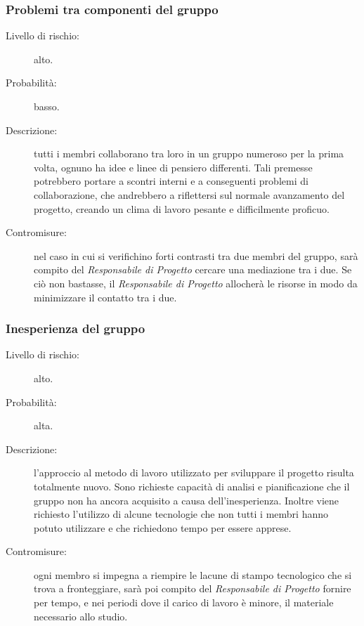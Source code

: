 \subsubsection{Problemi tra componenti del gruppo}
\begin{description}
	\item[Livello di rischio:] alto.
	\item[Probabilità:] basso.
	\item[Descrizione:] tutti i membri collaborano tra loro in un gruppo numeroso per la prima volta, ognuno ha idee e linee di pensiero differenti.
	Tali premesse potrebbero portare a scontri interni e a conseguenti problemi di collaborazione, che andrebbero a riflettersi sul normale	avanzamento del progetto, creando un clima di lavoro pesante e difficilmente proficuo.
	\item[Contromisure:] nel caso in cui si verifichino forti contrasti tra due membri del gruppo, sarà compito del \textit{Responsabile di Progetto} cercare una mediazione tra i due. Se ciò non bastasse, il \textit{Responsabile di Progetto} allocherà le risorse in modo da minimizzare il contatto tra i due.
\end{description}
\subsubsection{Inesperienza del gruppo}
\begin{description}
	\item[Livello di rischio:] alto.
	\item[Probabilità:] alta.
	\item[Descrizione:] l'approccio al metodo di lavoro utilizzato per sviluppare il progetto risulta totalmente nuovo. Sono richieste capacità di analisi	e pianificazione che il gruppo non ha ancora acquisito a causa dell'inesperienza. Inoltre viene richiesto l'utilizzo di alcune tecnologie che non tutti i membri hanno potuto utilizzare e che richiedono tempo per essere apprese.
	\item[Contromisure:] ogni membro si impegna a riempire le lacune di stampo tecnologico che si trova a fronteggiare, sarà poi compito del \textit{Responsabile di Progetto} fornire per tempo, e nei periodi dove il carico di lavoro è minore, il materiale necessario allo studio. 
\end{description}

